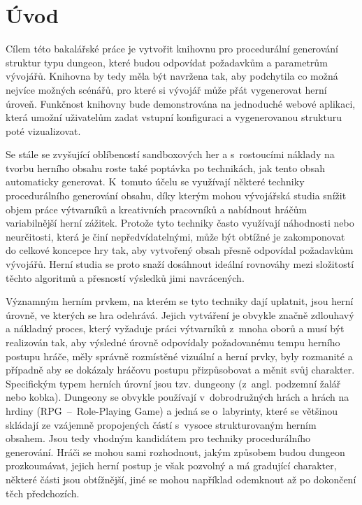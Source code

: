 
\chapter{Úvod}
\label{ch:uvod} %


Cílem této bakalářské práce je vytvořit knihovnu pro procedurální generování struktur typu dungeon, které budou odpovídat požadavkům a parametrům vývojářů.
Knihovna by tedy měla být navržena tak, aby podchytila co možná nejvíce možných scénářů, pro které si vývojář může přát vygenerovat herní úroveň.
Funkčnost knihovny bude demonstrována na jednoduché webové aplikaci, která umožní uživatelům zadat vstupní konfiguraci a vygenerovanou strukturu poté vizualizovat.
\par
Se stále se zvyšující oblíbeností sandboxových her a s~rostoucími náklady na tvorbu herního obsahu roste také poptávka po technikách, jak tento obsah automaticky generovat.
K~tomuto účelu se využívají některé techniky procedurálního generování obsahu, díky kterým mohou vývojářská studia snížit objem práce výtvarníků a kreativních pracovníků a nabídnout hráčům variabilnější herní zážitek.
Protože tyto techniky často využívají náhodnosti nebo neurčitosti, která je činí nepředvídatelnými, může být obtížné je zakomponovat do celkové koncepce hry tak, aby vytvořený obsah přesně odpovídal požadavkům vývojářů.
Herní studia se proto snaží dosáhnout ideální rovnováhy mezi složitostí těchto algoritmů a přesností výsledků jimi navrácených.
\par
Významným herním prvkem, na kterém se tyto techniky dají uplatnit, jsou herní úrovně, ve kterých se hra odehrává.
Jejich vytváření je obvykle značně zdlouhavý a nákladný proces, který vyžaduje práci výtvarníků z~mnoha oborů a musí být realizován tak, aby výsledné úrovně odpovídaly požadovanému tempu herního postupu hráče, měly správně rozmístěné vizuální a herní prvky, byly rozmanité a případně aby se dokázaly hráčovu postupu přizpůsobovat a měnit svůj charakter.
Specifickým typem herních úrovní jsou tzv. dungeony (z~angl. podzemní žalář nebo kobka).
Dungeony se obvykle používají v~dobrodružných hrách a hrách na hrdiny (RPG~--~Role-Playing Game) a jedná se o~labyrinty, které se většinou skládají ze vzájemně propojených částí s~vysoce strukturovaným herním obsahem. Jsou tedy vhodným kandidátem pro techniky procedurálního generování.
Hráči se mohou sami rozhodnout, jakým způsobem budou dungeon prozkoumávat, jejich herní postup je však pozvolný a má gradující charakter, některé části jsou obtížnější, jiné se mohou například odemknout až po dokončení těch předchozích.
